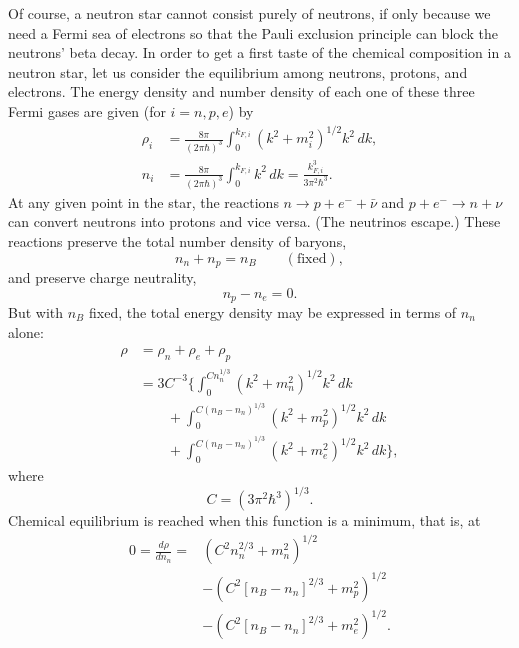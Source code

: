 Of course, a neutron star cannot consist purely of neutrons, if only because
we need a Fermi sea of electrons so that the Pauli exclusion principle can
block the neutrons' beta decay. In order to get a first taste of the chemical
composition in a neutron star, let us consider the equilibrium among neutrons,
protons, and electrons. The energy density and number density of each one of
these three Fermi gases are given (for \(i=n,p,e\)) by
\begin{align}
  \rho_i
  &=
  \frac{8\pi}{(2\pi\hbar)^3}
  \int_0^{k_{F,i}}(k^2+m_i^2)^{1/2}k^2\,dk,
  \tag{11.4.18}\label{eq:11.4.18}\\
  n_i
  &=
  \frac{8\pi}{(2\pi\hbar)^3}
  \int_0^{k_{F,i}}k^2\,dk
  =
  \frac{k_{F,i}^3}{3\pi^2\hbar^3}.
  \tag{11.4.19}\label{eq:11.4.19}
\end{align}
At any given point in the star, the reactions
\(n\to p+e^-+\bar\nu\) and \(p+e^-\to n+\nu\) can convert neutrons into
protons and vice versa. (The neutrinos escape.) These reactions preserve the
total number density of baryons,
\begin{equation}
  n_n+n_p=n_B\qquad(\text{fixed}),
  \tag{11.4.20}\label{eq:11.4.20}
\end{equation}
and preserve charge neutrality,
\begin{equation}
  n_p-n_e=0.
  \tag{11.4.21}\label{eq:11.4.21}
\end{equation}
But with \(n_B\) fixed, the total energy density may be expressed in terms of
\(n_n\) alone:
\begin{equation}
  \begin{aligned}
  \rho
  &=
  \rho_n+\rho_e+\rho_p\\
  &=
  3C^{-3}\bigg\{
    \int_0^{Cn_n^{1/3}}(k^2+m_n^2)^{1/2}k^2\,dk\\
  &\qquad
    +\int_0^{C(n_B-n_n)^{1/3}}(k^2+m_p^2)^{1/2}k^2\,dk\\
  &\qquad
    +\int_0^{C(n_B-n_n)^{1/3}}(k^2+m_e^2)^{1/2}k^2\,dk
  \bigg\},
  \end{aligned}
  \tag{11.4.22}\label{eq:11.4.22}
\end{equation}
where
\[
  C=(3\pi^2\hbar^3)^{1/3}.
\]
Chemical equilibrium is reached when this function is a minimum, that is, at
\[
  \begin{aligned}
  0=\frac{d\rho}{dn_n}
  ={}&
  (C^2n_n^{2/3}+m_n^2)^{1/2}\\
  &-(C^2[n_B-n_n]^{2/3}+m_p^2)^{1/2}\\
  &-(C^2[n_B-n_n]^{2/3}+m_e^2)^{1/2}.
  \end{aligned}
\]
